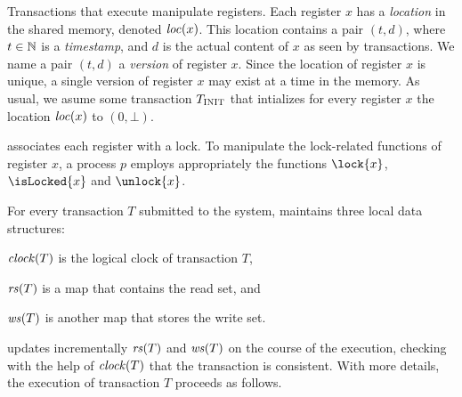 Transactions that execute  manipulate registers.
Each register $x$ has a \emph{location} in the shared memory, denoted $\locationOf{x}$.
This location contains a pair $(t,d)$, where $t \in \naturalSet$ is a \emph{timestamp}, 
and $d$ is the actual content of $x$ as seen by transactions.
We name a pair $(t,d)$ a \emph{version} of register $x$.
Since the location of register $x$ is unique, a single version of register $x$ may exist at a time in the memory.
As usual, we asume some transaction $\transInit$ that intializes 
for every register $x$ the location $\locationOf{x}$ to $(0,\bot)$.

 associates each register with a lock.
To manipulate the lock-related functions of register $x$, 
a process $p$ employs appropriately the functions $\lock{x}$, $\isLocked{x}$ and $\unlock{x}$.

For every transaction $T$ submitted to the system,  maintains three local data structures:
\begin{inparaenum}[]
\item $\clockOf{T}$ is the logical clock of transaction $T$,
\item $\readSetOf{T}$ is a map that contains the read set, and 
\item $\writeSetOf{T}$ is another map that stores the write set.
\end{inparaenum}
 updates incrementally $\readSetOf{T}$ and $\writeSetOf{T}$ on the course of the execution, checking with the help of $\clockOf{T}$ that the transaction is consistent.
With more details, the execution of transaction $T$ proceeds as follows.

